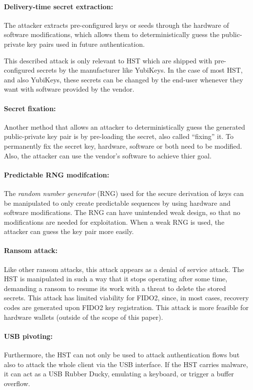 \documentclass[runningheads]{llncs}
\begin{document}
\paragraph{Delivery-time secret extraction:}
The attacker extracts pre-configured keys or seeds through the hardware of software modifications, which allows them to deterministically guess the public-private key pairs used in future authentication.

This described attack is only relevant to HST which are shipped with pre-configured secrets by the manufacturer like YubiKeys. In the case of most HST, and also YubiKeys, these secrets can be changed by the end-user whenever they want with software provided by the vendor.

\paragraph{Secret fixation:}
Another method that allows an attacker to deterministically guess the generated public-private key pair is by pre-loading the secret, also called ``fixing''  it. To permanently fix the secret key, hardware, software or both need to be modified. Also, the attacker can use the vendor's software to achieve thier goal.

\paragraph{Predictable RNG modifcation:}
The \textit{random number generator} (RNG) used for the secure derivation of keys can be manipulated to only create predictable sequences by using hardware and software modifications. The RNG can have unintended weak design, so that no modifications are needed for exploitation. When a weak RNG is used, the attacker can guess the key pair more easily.

\paragraph{Ransom attack:}
Like other ransom attacks, this attack appears as a denial of service attack. The HST is manipulated in such a way that it stops operating after some time, demanding a ransom to resume its work with a threat to delete the stored secrets. This attack has limited viability for FIDO2, since, in most cases, recovery codes are generated upon FIDO2 key registration. This attack is more feasible for hardware wallets (outside of the scope of this paper).

\paragraph{USB pivoting:}
Furthermore, the HST can not only be used to attack authentication flows but also to attack the whole client via the USB interface. If the HST carries malware, it can act as a USB Rubber Ducky, emulating a keyboard, or trigger a buffer overflow.
\end{document}
